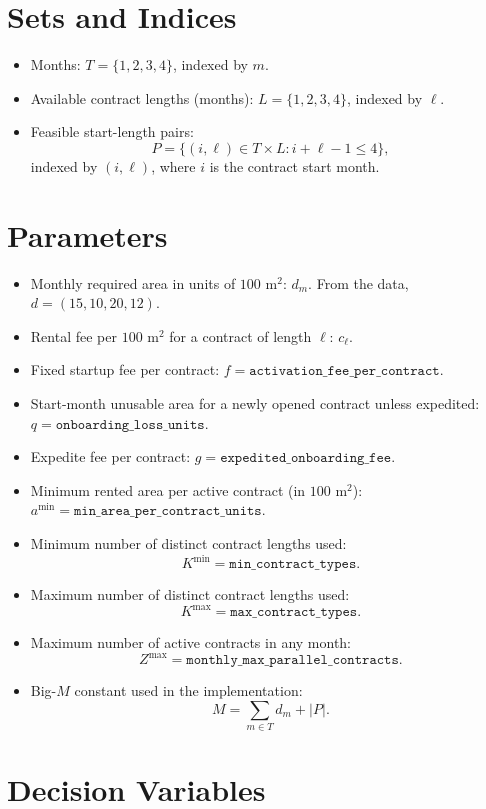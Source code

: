 \section*{Sets and Indices}

\begin{itemize}
\item Months: $T=\{1,2,3,4\}$, indexed by $m$.
\item Available contract lengths (months): $L=\{1,2,3,4\}$, indexed by $\ell$.
\item Feasible start-length pairs:
\[
P=\{(i,\ell)\in T\times L : i+\ell-1 \le 4\},
\]
indexed by $(i,\ell)$, where $i$ is the contract start month.
\end{itemize}

\section*{Parameters}

\begin{itemize}
\item Monthly required area in units of $100\text{ m}^2$: $d_m$.
From the data, $d=(15,10,20,12)$.
\item Rental fee per $100\text{ m}^2$ for a contract of length $\ell$: $c_\ell$.
\item Fixed startup fee per contract: $f = \texttt{activation\_fee\_per\_contract}$.
\item Start-month unusable area for a newly opened contract unless expedited: $q = \texttt{onboarding\_loss\_units}$.
\item Expedite fee per contract: $g = \texttt{expedited\_onboarding\_fee}$.
\item Minimum rented area per active contract (in $100\text{ m}^2$): $a^{\min}=\texttt{min\_area\_per\_contract\_units}$.
\item Minimum number of distinct contract lengths used:
\[
K^{\min}=\texttt{min\_contract\_types}.
\]
\item Maximum number of distinct contract lengths used:
\[
K^{\max}=\texttt{max\_contract\_types}.
\]
\item Maximum number of active contracts in any month:
\[
Z^{\max}=\texttt{monthly\_max\_parallel\_contracts}.
\]
\item Big-$M$ constant used in the implementation:
\[
M=\sum_{m\in T} d_m + |P|.
\]
\end{itemize}

\section*{Decision Variables}


